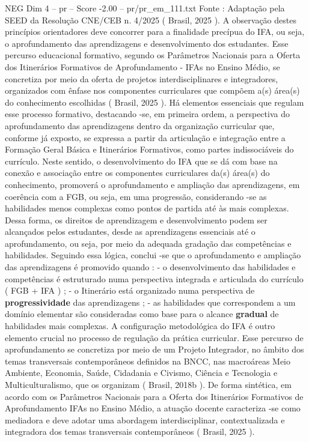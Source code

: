 \begin{textsample}{NEG Dim 4 – pr – Score -2.00 – pr/pr\_em\_111.txt}
Fonte : Adaptação pela SEED da Resolução CNE/CEB n. 4/2025 ( Brasil, 2025 ).
A observação destes princípios orientadores deve concorrer para a finalidade precípua do IFA, ou seja, o aprofundamento das aprendizagens e desenvolvimento dos estudantes.
Esse percurso educacional formativo, segundo os Parâmetros Nacionais para a Oferta dos Itinerários Formativos de Aprofundamento - IFAs no Ensino Médio, se concretiza por meio da oferta de projetos interdisciplinares e integradores, organizados com ênfase nos componentes curriculares que compõem a(s) área(s) do conhecimento escolhidas ( Brasil, 2025 ).
Há elementos essenciais que regulam esse processo formativo, destacando -se, em primeira ordem, a perspectiva do aprofundamento das aprendizagens dentro da organização curricular que, conforme já exposto, se expressa a partir da articulação e integração entre a Formação Geral Básica e Itinerários Formativos, como partes indissociáveis do currículo.
Neste sentido, o desenvolvimento do IFA que se dá com base na conexão e associação entre os componentes curriculares da(s) área(s) do conhecimento, promoverá o aprofundamento e ampliação das aprendizagens, em coerência com a FGB, ou seja, em uma progressão, considerando -se as habilidades menos complexas como pontos de partida até às mais complexas.
Dessa forma, os direitos de aprendizagem e desenvolvimento podem ser alcançados pelos estudantes, desde as aprendizagens essenciais até o aprofundamento, ou seja, por meio da adequada gradação das competências e habilidades.
Seguindo essa lógica, conclui -se que o aprofundamento e ampliação das aprendizagens é promovido quando : - o desenvolvimento das habilidades e competências é estruturado numa perspectiva integrada e articulada do currículo ( FGB + IFA ) ; - o Itinerário está organizado numa perspectiva de \textbf{progressividade} das aprendizagens ; - as habilidades que correspondem a um domínio elementar são consideradas como base para o alcance \textbf{gradual} de habilidades mais complexas.
A configuração metodológica do IFA é outro elemento crucial no processo de regulação da prática curricular.
Esse percurso de aprofundamento se concretiza por meio de um Projeto Integrador, no âmbito dos temas transversais contemporâneos definidos na BNCC, nas macroáreas Meio Ambiente, Economia, Saúde, Cidadania e Civismo, Ciência e Tecnologia e Multiculturalismo, que os organizam ( Brasil, 2018b ).
De forma sintética, em acordo com os Parâmetros Nacionais para a Oferta dos Itinerários Formativos de Aprofundamento IFAs no Ensino Médio, a atuação docente caracteriza -se como mediadora e deve adotar uma abordagem interdisciplinar, contextualizada e integradora dos temas transversais contemporâneos ( Brasil, 2025 ).

\end{textsample}
